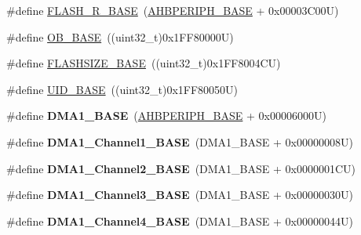\begin{DoxyCompactItemize}
\item 
\#define \hyperlink{group___peripheral__memory__map_ga8e21f4845015730c5731763169ec0e9b}{F\-L\-A\-S\-H\-\_\-\-R\-\_\-\-B\-A\-S\-E}~(\hyperlink{group___peripheral__memory__map_ga92eb5d49730765d2abd0f5b09548f9f5}{A\-H\-B\-P\-E\-R\-I\-P\-H\-\_\-\-B\-A\-S\-E} + 0x00003\-C00\-U)
\item 
\#define \hyperlink{group___peripheral__memory__map_gab5b5fb155f9ee15dfb6d757da1adc926}{O\-B\-\_\-\-B\-A\-S\-E}~((uint32\-\_\-t)0x1\-F\-F80000\-U)
\item 
\#define \hyperlink{group___peripheral__memory__map_ga776d985f2d4d40b588ef6ca9d573af78}{F\-L\-A\-S\-H\-S\-I\-Z\-E\-\_\-\-B\-A\-S\-E}~((uint32\-\_\-t)0x1\-F\-F8004\-C\-U)
\item 
\#define \hyperlink{group___peripheral__memory__map_ga664eda42b83c919b153b07b23348be67}{U\-I\-D\-\_\-\-B\-A\-S\-E}~((uint32\-\_\-t)0x1\-F\-F80050\-U)
\item 
\hypertarget{group___peripheral__memory__map_gab2d8a917a0e4ea99a22ac6ebf279bc72}{\#define {\bfseries D\-M\-A1\-\_\-\-B\-A\-S\-E}~(\hyperlink{group___peripheral__memory__map_ga92eb5d49730765d2abd0f5b09548f9f5}{A\-H\-B\-P\-E\-R\-I\-P\-H\-\_\-\-B\-A\-S\-E} + 0x00006000\-U)}\label{group___peripheral__memory__map_gab2d8a917a0e4ea99a22ac6ebf279bc72}

\item 
\hypertarget{group___peripheral__memory__map_ga888dbc1608243badeb3554ffedc7364c}{\#define {\bfseries D\-M\-A1\-\_\-\-Channel1\-\_\-\-B\-A\-S\-E}~(D\-M\-A1\-\_\-\-B\-A\-S\-E + 0x00000008\-U)}\label{group___peripheral__memory__map_ga888dbc1608243badeb3554ffedc7364c}

\item 
\hypertarget{group___peripheral__memory__map_ga38a70090eef3687e83fa6ac0c6d22267}{\#define {\bfseries D\-M\-A1\-\_\-\-Channel2\-\_\-\-B\-A\-S\-E}~(D\-M\-A1\-\_\-\-B\-A\-S\-E + 0x0000001\-C\-U)}\label{group___peripheral__memory__map_ga38a70090eef3687e83fa6ac0c6d22267}

\item 
\hypertarget{group___peripheral__memory__map_ga70b3d9f36ca9ce95b4e421c11154fe5d}{\#define {\bfseries D\-M\-A1\-\_\-\-Channel3\-\_\-\-B\-A\-S\-E}~(D\-M\-A1\-\_\-\-B\-A\-S\-E + 0x00000030\-U)}\label{group___peripheral__memory__map_ga70b3d9f36ca9ce95b4e421c11154fe5d}

\item 
\hypertarget{group___peripheral__memory__map_ga1adc93cd0baf0897202c71110e045692}{\#define {\bfseries D\-M\-A1\-\_\-\-Channel4\-\_\-\-B\-A\-S\-E}~(D\-M\-A1\-\_\-\-B\-A\-S\-E + 0x00000044\-U)}\label{group___peripheral__memory__map_ga1adc93cd0baf0897202c71110e045692}


\end{DoxyCompactItemize}
